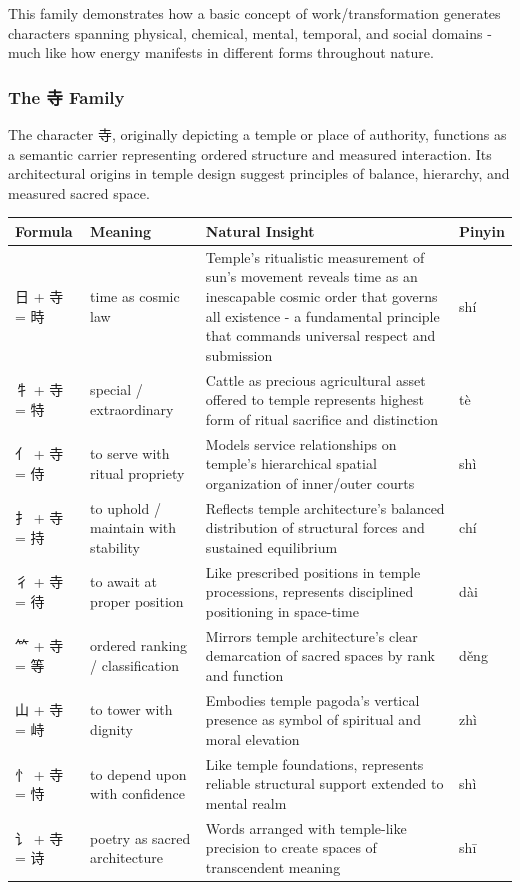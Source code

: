 \documentclass[11pt,letterpaper]{article}
\begin{document}
This family demonstrates how a basic concept of work/transformation
generates characters spanning physical, chemical, mental, temporal, and
social domains - much like how energy manifests in different forms
throughout nature.

\subsubsection{The 寺 Family}\label{the-ux5bfa-family}

The character 寺, originally depicting a temple or place of authority,
functions as a semantic carrier representing ordered structure and
measured interaction. Its architectural origins in temple design suggest
principles of balance, hierarchy, and measured sacred space.

\begin{longtable}{|p{3cm}|p{3cm}|p{6cm}|p{2cm}|}
\hline
\textbf{Formula} & \textbf{Meaning} & \textbf{Natural Insight} & \textbf{Pinyin} \\
\hline
日 + 寺 = 時 & time as cosmic law & Temple's ritualistic measurement of
sun's movement reveals time as an inescapable cosmic order that governs
all existence - a fundamental principle that commands universal respect
and submission & shí \\
\hline
牜 + 寺 = 特 & special / extraordinary & Cattle as precious agricultural
asset offered to temple represents highest form of ritual sacrifice and
distinction & tè \\
\hline
亻 + 寺 = 侍 & to serve with ritual propriety & Models service
relationships on temple's hierarchical spatial organization of
inner/outer courts & shì \\
\hline
扌 + 寺 = 持 & to uphold / maintain with stability & Reflects temple
architecture's balanced distribution of structural forces and sustained
equilibrium & chí \\
\hline
彳 + 寺 = 待 & to await at proper position & Like prescribed positions
in temple processions, represents disciplined positioning in space-time
& dài \\
\hline
⺮ + 寺 = 等 & ordered ranking / classification & Mirrors temple
architecture's clear demarcation of sacred spaces by rank and function &
děng \\
\hline
山 + 寺 = 峙 & to tower with dignity & Embodies temple pagoda's vertical
presence as symbol of spiritual and moral elevation & zhì \\
\hline
忄 + 寺 = 恃 & to depend upon with confidence & Like temple foundations,
represents reliable structural support extended to mental realm & shì \\
\hline
讠 + 寺 = 诗 & poetry as sacred architecture & Words arranged with
temple-like precision to create spaces of transcendent meaning & shī \\
\hline
\end{longtable}
\end{document}
